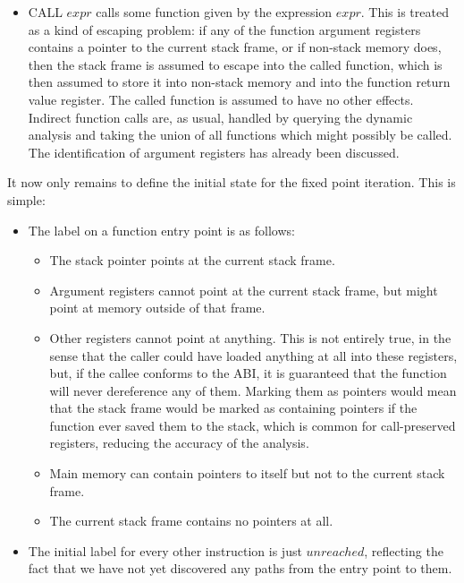 \begin{itemize}
\item
  CALL $expr$ calls some function given by the expression $expr$.
  This is treated as a kind of escaping problem: if any of the
  function argument registers contains a pointer to the current stack
  frame, or if non-stack memory does, then the stack frame is assumed
  to escape into the called function, which is then assumed to store
  it into non-stack memory and into the function return value
  register.  The called function is assumed to have no other
  effects.  Indirect function calls
  are, as usual, handled by querying the dynamic analysis and taking
  the union of all functions which might possibly be called.  The
  identification of argument registers has already been discussed.
\end{itemize}

It now only remains to define the initial state for the fixed point
iteration.  This is simple:

\begin{itemize}
\item
  The label on a function entry point is as follows:

  \begin{itemize}
  \item The stack pointer points at the current stack frame.
  \item Argument registers cannot point at the current stack frame,
    but might point at memory outside of that frame.
  \item Other registers cannot point at anything.  This is not
    entirely true, in the sense that the caller could have loaded
    anything at all into these registers, but, if the callee conforms
    to the ABI, it is guaranteed that the function will never
    dereference any of them.  Marking them as pointers would mean that
    the stack frame would be marked as containing pointers if the
    function ever saved them to the stack, which is common for
    call-preserved registers, reducing the accuracy of the analysis.
  \item Main memory can contain pointers to itself but not to the
    current stack frame.
  \item The current stack frame contains no pointers at all.
  \end{itemize}
\item
  The initial label for every other instruction is just $unreached$,
  reflecting the fact that we have not yet discovered any paths from
  the entry point to them.
\end{itemize}

